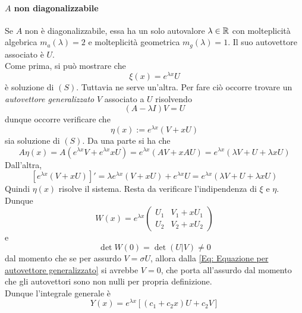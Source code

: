 \paragraph{$A$ non diagonalizzabile}
Se $A$ non è diagonalizzabile, essa ha un solo autovalore $\lambda \in \mathbb{R}$ con molteplicità algebrica $m_a(\lambda)=2$ e molteplicità geometrica $m_g(\lambda)=1$. Il suo autovettore associato è $U$.\\
Come prima, si può mostrare che 
\begin{equation}
    \xi(x)=e^{\lambda x}U
\end{equation}
è soluzione di $(S)$. Tuttavia ne serve un'altra. Per fare ciò occorre trovare un \textit{autovettore generalizzato} $V$ associato a $U$ risolvendo
\begin{equation} \label{Eq: Equazione per autovettore generalizzato}
    (A-\lambda I)V=U
\end{equation}
dunque occorre verificare che 
\begin{equation}
    \eta(x):= e^{\lambda x}(V+xU)
\end{equation}
sia soluzione di $(S)$. Da una parte si ha che
\begin{equation}
    A \eta(x)= A(e^{\lambda x}V+e^{\lambda x}xU) = e^{\lambda x}(AV+ xAU)= e^{\lambda x}(\lambda V + U + \lambda x U)
\end{equation}
Dall'altra, 
\begin{equation}
    \left[e^{\lambda x}(V+xU)\right]'= \lambda
    e^{\lambda x}(V+xU) + e^{\lambda x}U = e^{\lambda x}(\lambda V + U + \lambda x U)
\end{equation}
Quindi $\eta(x)$ risolve il sistema. Resta da verificare l'indipendenza di $\xi$ e $\eta$. Dunque 
\begin{equation}
    W(x)= e^{\lambda x} \begin{pmatrix}
        U_1 & V_1 + x U_1\\
        U_2 & V_2 + x U_2
    \end{pmatrix}
\end{equation}
e 
\begin{equation}
    \det W(0) = \det(U | V) \neq 0
\end{equation}
dal momento che se per assurdo $V= \sigma U$, allora dalla \eqref{Eq: Equazione per autovettore generalizzato} si avrebbe $V=0$, che porta all'assurdo dal momento che gli autovettori sono non nulli per propria definizione.\\
Dunque l'integrale generale è 
\begin{equation}
    Y(x)= e^{\lambda x}[(c_1+c_2x)U+ c_2V]
\end{equation}
